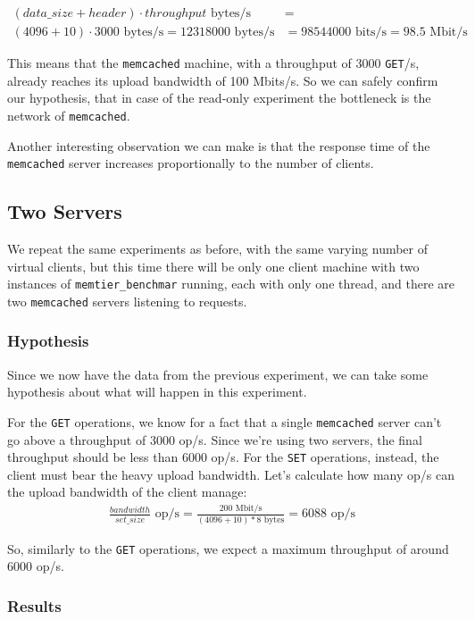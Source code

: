 \documentclass[11pt,a4paper]{article}
\renewcommand{\t}[1]{%
	{\texttt{#1}}}
\begin{document}
\begin{align*}
	(data\_size + header)  \cdot throughput \text{ bytes/s} &= \\
	(4096 + 10) \cdot 3000 \text{ bytes/s} =  
	12318000 \text{ bytes/s} &= 
	98544000 \text{ bits/s} = 98.5 \text{ Mbit/s}
\end{align*}


This means that the \t{memcached} machine, with a throughput of 3000 \t{GET}/s, already reaches its upload bandwidth of 100 Mbits/s. So we can safely confirm our hypothesis, that in case of the read-only experiment the bottleneck is the network of \t{memcached}.

Another interesting observation we can make is that the response time of the \t{memcached} server increases proportionally to the number of clients.

\subsection{Two Servers}

We repeat the same experiments as before, with the same varying number of
virtual clients, but this time there will be only one client machine with two instances of
\t{memtier\_benchmar} running, each with only one thread, and there are two
\t{memcached} servers listening to requests.  

\subsubsection{Hypothesis}

Since we now have the data from the previous experiment, we can take some hypothesis about what will happen in this experiment.

For the \t{GET} operations, we know for a fact that a single \t{memcached} server can't go above a throughput of 3000 op/s. Since we're using two servers, the final throughput should be less than 6000 op/s.
For the \t{SET} operations, instead, 
the client must bear the heavy upload bandwidth. Let's calculate how many op/s can the upload bandwidth of the client manage:
\begin{align*}
	\frac{bandwidth}{set\_size} \text{ op/s} = \frac{200 \text{ Mbit/s}}{(4096+10)*8 \text{ bytes}} =  
	6088 \text{ op/s} 
\end{align*}

So, similarly to the \t{GET} operations, we expect a maximum throughput of around 6000 op/s. 

\subsubsection{Results}
\end{document}
